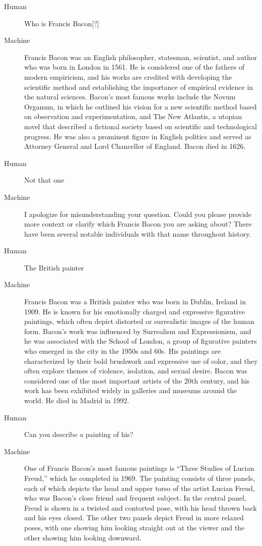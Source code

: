 \begin{description}
\item[Human] Who is Francis Bacon[?]
\item[Machine] Francis Bacon was an English philosopher, statesman, scientist,
    and author who was born in London in 1561. He is considered one of the
    fathers of modern empiricism, and his works are credited with developing the
    scientific method and establishing the importance of empirical evidence in
    the natural sciences. Bacon's most famous works include the Novum Organum,
    in which he outlined his vision for a new scientific method based on
    observation and experimentation, and The New Atlantis, a utopian novel that
    described a fictional society based on scientific and technological
    progress. He was also a prominent figure in English politics and served as
    Attorney General and Lord Chancellor of England. Bacon died in 1626.
\item[Human] Not that one
\item[Machine] I apologize for misunderstanding your question. Could you please
    provide more context or clarify which Francis Bacon you are asking about?
    There have been several notable individuals with that name throughout
    history.
\item[Human] The British painter
\item[Machine] Francis Bacon was a British painter who was born in Dublin,
    Ireland in 1909. He is known for his emotionally charged and expressive
    figurative paintings, which often depict distorted or surrealistic images of
    the human form. Bacon's work was influenced by Surrealism and Expressionism,
    and he was associated with the School of London, a group of figurative
    painters who emerged in the city in the 1950s and 60s. His paintings are
    characterized by their bold brushwork and expressive use of color, and they
    often explore themes of violence, isolation, and sexual desire. Bacon was
    considered one of the most important artists of the 20th century, and his
    work has been exhibited widely in galleries and museums around the world. He
    died in Madrid in 1992.
\item[Human] Can you describe a painting of his?
\item[Machine] One of Francis Bacon's most famous paintings is ``Three Studies
    of Lucian Freud,'' which he completed in 1969. The painting consists of
    three panels, each of which depicts the head and upper torso of the artist
    Lucian Freud, who was Bacon's close friend and frequent subject. In the
    central panel, Freud is shown in a twisted and contorted pose, with his head
    thrown back and his eyes closed. The other two panels depict Freud in more
    relaxed poses, with one showing him looking straight out at the viewer and
    the other showing him looking downward.


\end{description}
